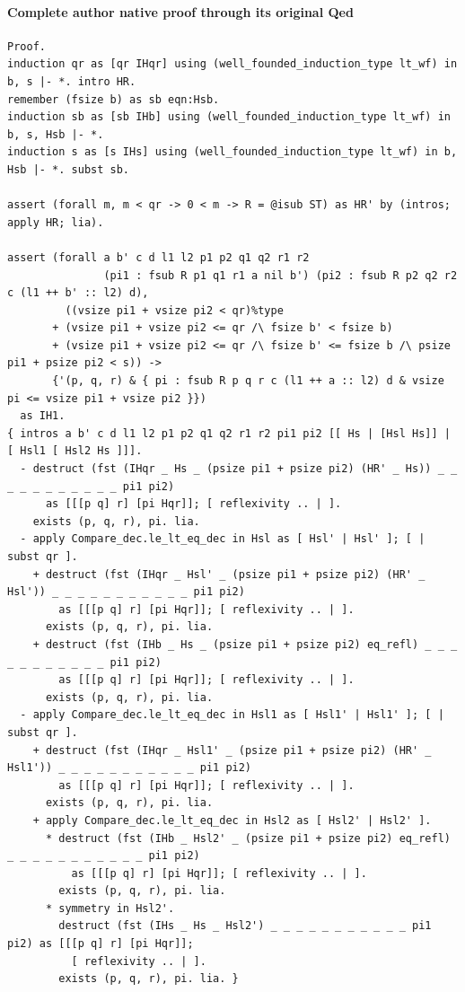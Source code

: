 \documentclass[10pt,a4paper]{article}
\begin{document}
\paragraph{Complete author native proof through its original Qed}
\begin{lstlisting}
Proof.
induction qr as [qr IHqr] using (well_founded_induction_type lt_wf) in b, s |- *. intro HR.
remember (fsize b) as sb eqn:Hsb.
induction sb as [sb IHb] using (well_founded_induction_type lt_wf) in b, s, Hsb |- *.
induction s as [s IHs] using (well_founded_induction_type lt_wf) in b, Hsb |- *. subst sb.

assert (forall m, m < qr -> 0 < m -> R = @isub ST) as HR' by (intros; apply HR; lia).

assert (forall a b' c d l1 l2 p1 p2 q1 q2 r1 r2
               (pi1 : fsub R p1 q1 r1 a nil b') (pi2 : fsub R p2 q2 r2 c (l1 ++ b' :: l2) d),
         ((vsize pi1 + vsize pi2 < qr)%type
       + (vsize pi1 + vsize pi2 <= qr /\ fsize b' < fsize b)
       + (vsize pi1 + vsize pi2 <= qr /\ fsize b' <= fsize b /\ psize pi1 + psize pi2 < s)) ->
       {'(p, q, r) & { pi : fsub R p q r c (l1 ++ a :: l2) d & vsize pi <= vsize pi1 + vsize pi2 }})
  as IH1.
{ intros a b' c d l1 l2 p1 p2 q1 q2 r1 r2 pi1 pi2 [[ Hs | [Hsl Hs]] | [ Hsl1 [ Hsl2 Hs ]]].
  - destruct (fst (IHqr _ Hs _ (psize pi1 + psize pi2) (HR' _ Hs)) _ _ _ _ _ _ _ _ _ _ _ pi1 pi2)
      as [[[p q] r] [pi Hqr]]; [ reflexivity .. | ].
    exists (p, q, r), pi. lia.
  - apply Compare_dec.le_lt_eq_dec in Hsl as [ Hsl' | Hsl' ]; [ | subst qr ].
    + destruct (fst (IHqr _ Hsl' _ (psize pi1 + psize pi2) (HR' _ Hsl')) _ _ _ _ _ _ _ _ _ _ _ pi1 pi2)
        as [[[p q] r] [pi Hqr]]; [ reflexivity .. | ].
      exists (p, q, r), pi. lia.
    + destruct (fst (IHb _ Hs _ (psize pi1 + psize pi2) eq_refl) _ _ _ _ _ _ _ _ _ _ _ pi1 pi2)
        as [[[p q] r] [pi Hqr]]; [ reflexivity .. | ].
      exists (p, q, r), pi. lia.
  - apply Compare_dec.le_lt_eq_dec in Hsl1 as [ Hsl1' | Hsl1' ]; [ | subst qr ].
    + destruct (fst (IHqr _ Hsl1' _ (psize pi1 + psize pi2) (HR' _ Hsl1')) _ _ _ _ _ _ _ _ _ _ _ pi1 pi2)
        as [[[p q] r] [pi Hqr]]; [ reflexivity .. | ].
      exists (p, q, r), pi. lia.
    + apply Compare_dec.le_lt_eq_dec in Hsl2 as [ Hsl2' | Hsl2' ].
      * destruct (fst (IHb _ Hsl2' _ (psize pi1 + psize pi2) eq_refl) _ _ _ _ _ _ _ _ _ _ _ pi1 pi2)
          as [[[p q] r] [pi Hqr]]; [ reflexivity .. | ].
        exists (p, q, r), pi. lia.
      * symmetry in Hsl2'.
        destruct (fst (IHs _ Hs _ Hsl2') _ _ _ _ _ _ _ _ _ _ _ pi1 pi2) as [[[p q] r] [pi Hqr]];
          [ reflexivity .. | ].
        exists (p, q, r), pi. lia. }


\end{lstlisting}
\end{document}
